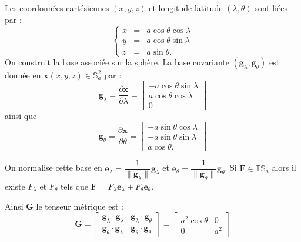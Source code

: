 Les coordonnées cartésiennes $(x,y,z)$ et longitude-latitude $(\lambda, \theta)$ sont liées par :
\begin{equation}
\left\lbrace 
\begin{array}{rcl}
x & = & a \cos \theta \cos \lambda \\
y & = & a \cos \theta \sin \lambda \\
z & = & a \sin \theta.
\end{array}
\right.
\end{equation}
On construit la base associée sur la sphère. La base covariante $( \mathbf{g}_{\lambda}, \mathbf{g}_{\theta})$ est donnée en $\mathbf{x} (x,y,z) \in \mathbb{S}_a^2$ par :
\begin{equation}
\mathbf{g}_{\lambda} = \dfrac{\partial \mathbf{x}}{\partial \lambda} = \begin{bmatrix}
- a \cos \theta \sin \lambda \\ 
a \cos \theta \cos \lambda \\ 
0
\end{bmatrix} 
\end{equation}
ainsi que 
\begin{equation}\label{coord_latlon}
\mathbf{g}_{\theta} = \dfrac{\partial \mathbf{x}}{\partial \theta} = \begin{bmatrix}
- a \sin \theta \cos \lambda \\ 
- a \sin \theta \sin \lambda \ \\ 
a \cos \theta.
\end{bmatrix} 
\end{equation}

\begin{remarque}
\label{base_lonlat}
On normalise cette base en $\mathbf{e}_{\lambda} = \dfrac{1}{\| \mathbf{g}_{\lambda} \|} \mathbf{g}_{\lambda}$ et $\mathbf{e}_{\theta} = \dfrac{1}{\| \mathbf{g}_{\theta} \|} \mathbf{g}_{\theta}$. Si $\mathbf{F} \in \mathbb{T}\mathbb{S}_a$ alors il existe $F_{\lambda}$ et $F_{\theta}$ tels que $\mathbf{F} = F_{\lambda} \mathbf{e}_{\lambda} + F_{\theta} \mathbf{e}_{\theta}$.
\end{remarque}

Ainsi $\mathbf{G}$ le tenseur métrique est :
\begin{equation}
\mathbf{G} = 
\begin{bmatrix}
\mathbf{g}_{\lambda} \cdot \mathbf{g}_{\lambda} & \mathbf{g}_{\lambda} \cdot \mathbf{g}_{\theta} \\
\mathbf{g}_{\theta} \cdot \mathbf{g}_{\lambda} & \mathbf{g}_{\theta} \cdot \mathbf{g}_{\theta}
\end{bmatrix}
 =
\begin{bmatrix}
a^2 \cos \theta & 0 \\
0 & a^2
\end{bmatrix}
\end{equation}

